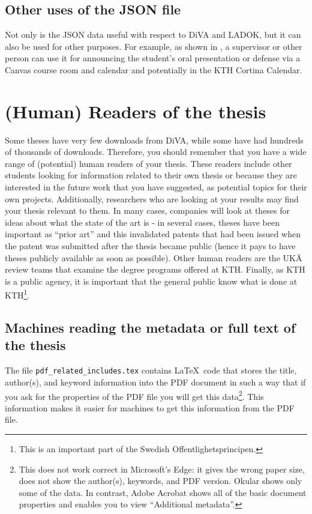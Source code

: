 \documentclass[12pt, twoside]{article}
\newcommand{\fname}[1]{\texttt{#1}}
\begin{document}
\subsection{Other uses of the JSON file}
Not only is the JSON data useful with respect to \gls{DiVA} and \gls{LADOK}, but it can also be used for other purposes. For example, as shown in , a supervisor or other person can use it for announcing the student's oral presentation or defense via a Canvas course room and calendar and potentially in the KTH Cortina Calendar.
\clearpage

\section{(Human) Readers of the thesis}
\label{sec:readers}
Some theses have very few downloads from \gls{DiVA}, while some have had hundreds of thousands of downloads. Therefore, you should remember that you have a wide range of (potential) human readers of your thesis. These readers include other students looking for information related to their own thesis or because they are interested in the future work that you have suggested, as potential topics for their own projects. Additionally, researchers who are looking at your results may find your thesis relevant to them. In many cases, companies will look at theses for ideas about what the state of the art is - in several cases, theses have been important as ``prior art'' and this invalidated patents that had been issued when the patent was submitted after the thesis became public (hence it pays to have theses publicly available as soon as possible). Other human readers are the \foreignlanguage{swedish}{\gls{UKÄ}} review teams that examine the degree programs offered at \gls{KTH}. Finally, as \gls{KTH} is a public agency, it is important that the general public know what is done at \gls{KTH}\footnote{This is an important part of the Swedish \foreignlanguage{swedish}{Offentlighetsprincipen}.}.


\subsection{Machines reading the metadata or full text of the thesis}
\label{sec:searchEngines}
The file \fname{pdf\_related\_includes.tex} contains \LaTeX\ code that stores the title, author(s), and keyword information into the PDF document in such a way that if you ask for the properties of the PDF file you will get this data\footnote{This does not work correct in Microsoft's Edge: it gives the wrong paper size, does not show the author(s), keywords, and PDF version. Okular shows only some of the data. In contrast, Adobe Acrobat shows all of the basic document properties and enables you to view ``Additional metadata''.}. This information makes it easier for machines to get this information from the PDF file.
\end{document}

